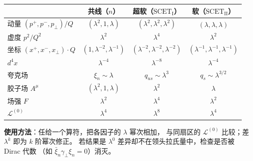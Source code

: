 \documentclass[UTF8,a4paper,11pt]{ctexart}
\theoremstyle{definition}
\theoremstyle{remark}
\theoremstyle{plain}
\newcommand{\SCETI}{\text{SCET}_{\mathrm{I}}}
\newcommand{\SCETII}{\text{SCET}_{\mathrm{II}}}
\begin{document}
\begin{center}
\begin{tabular}{@{}lccc@{}}
\toprule
 & 共线（$n$） & 超软（$\SCETI$） & 软（$\SCETII$） \\
\midrule
动量 $(p^+,p^-,p_\perp)/Q$ & $(\lambda^2,1,\lambda)$
  & $(\lambda^2,\lambda^2,\lambda^2)$ & $(\lambda,\lambda,\lambda)$ \\
虚度 $p^2/Q^2$ & $\lambda^2$ & $\lambda^4$ & $\lambda^2$ \\
坐标 $(x^+,x^-,x_\perp)\cdot Q$ & $(1,\lambda^{-2},\lambda^{-1})$
  & $(\lambda^{-2},\lambda^{-2},\lambda^{-2})$ & $(\lambda^{-1},\lambda^{-1},\lambda^{-1})$ \\
$d^4x$ & $\lambda^{-4}$ & $\lambda^{-8}$ & $\lambda^{-4}$ \\
夸克场 & $\xi_n\sim\lambda$ & $q_{us}\sim\lambda^3$ & $q_s\sim\lambda^{3/2}$ \\
胶子场 $A^\mu$ & $(\lambda^2,1,\lambda)$ & $\lambda^2$ & $\lambda$ \\
场强 $F$ & $\lambda^2$ & $\lambda^4$ & $\lambda^2$ \\
$\mathcal L^{(0)}$ & $\lambda^4$ & $\lambda^8$ & $\lambda^4$ \\
\bottomrule
\end{tabular}
\end{center}

\vspace{1em}
\noindent
\textbf{使用方法}：任给一个算符，把各因子的 $\lambda$ 幂次相加，
与同扇区的 $\mathcal L^{(0)}$ 比较；差 $\lambda^k$ 即为 $k$ 阶幂次修正。
若结果是 $\lambda^0$ 差异却不在领头拉氏量中，检查是否被 Dirac 代数
（如 $\bar\xi_n\gamma_\perp\xi_n=0$）消灭。
\end{document}
